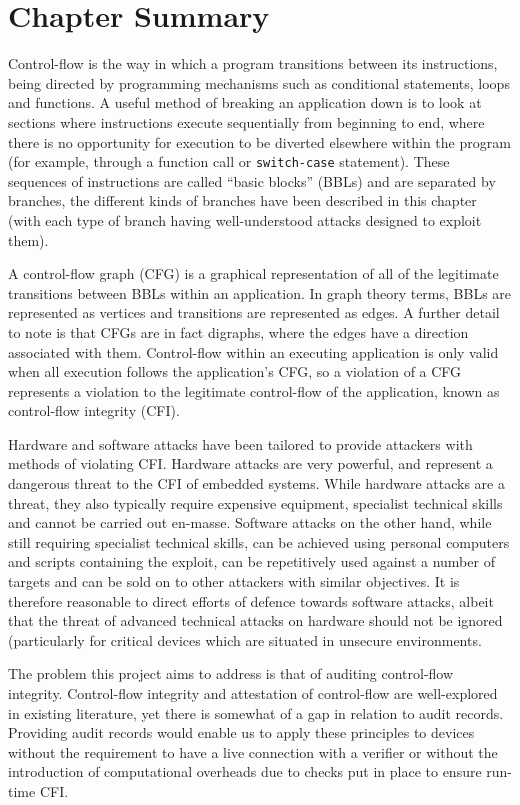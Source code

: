 \section{Chapter Summary}
Control-flow is the way in which a program transitions between its instructions, being directed by programming mechanisms such as conditional statements, loops and functions. A useful method of breaking an application down is to look at sections where instructions execute sequentially from beginning to end, where there is no opportunity for execution to be diverted elsewhere within the program (for example, through a function call or \verb|switch-case| statement). These sequences of instructions are called ``basic blocks'' (BBLs) and are separated by branches, the different kinds of branches have been described in this chapter (with each type of branch having well-understood attacks designed to exploit them).

A control-flow graph (CFG) is a graphical representation of all of the legitimate transitions between BBLs within an application. In graph theory terms, BBLs are represented as vertices and transitions are represented as edges. A further detail to note is that CFGs are in fact digraphs, where the edges have a direction associated with them. Control-flow within an executing application is only valid when all execution follows the application's CFG, so a violation of a CFG represents a violation to the legitimate control-flow of the application, known as control-flow integrity (CFI).

Hardware and software attacks have been tailored to provide attackers with methods of violating CFI. Hardware attacks are very powerful, and represent a dangerous threat to the CFI of embedded systems. While hardware attacks are a threat, they also typically require expensive equipment, specialist technical skills and cannot be carried out en-masse. Software attacks on the other hand, while still requiring specialist technical skills, can be achieved using personal computers and scripts containing the exploit, can be repetitively used against a number of targets and can be sold on to other attackers with similar objectives. It is therefore reasonable to direct efforts of defence towards software attacks, albeit that the threat of advanced technical attacks on hardware should not be ignored (particularly for critical devices which are situated in unsecure environments.

The problem this project aims to address is that of auditing control-flow integrity. Control-flow integrity and attestation of control-flow are well-explored in existing literature, yet there is somewhat of a gap in relation to audit records.  Providing audit records would enable us to apply these principles to devices without the requirement to have a live connection with a verifier or without the introduction of computational overheads due to checks put in place to ensure run-time CFI.